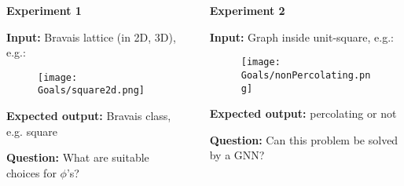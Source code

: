 \vspace{-0.5cm}
\begin{columns}[T]
    \begin{column}{0.49\textwidth}
        \textbf{Experiment 1}\par
        \textbf{Input:} Bravais lattice (in 2D, 3D), e.g.:
        \begin{figure}
            \centering
            \texttt{[image: Goals/square2d.png]}                        
        \end{figure}
        \textbf{Expected output:} Bravais class, e.g. square\par
        \textbf{Question:} What are suitable choices for $\phi$'s?
    \end{column}
    \begin{column}{0.01\textwidth}
    \end{column}
    \begin{column}{0.49\textwidth}
        \textbf{Experiment 2}\par  
        \textbf{Input:} Graph inside unit-square, e.g.: 
        \begin{figure}
            \centering
            \texttt{[image: Goals/nonPercolating.png]}                        
        \end{figure}
        \textbf{Expected output:} percolating or not\par
        \textbf{Question:} Can this problem be solved by a GNN?
    \end{column}
\end{columns}